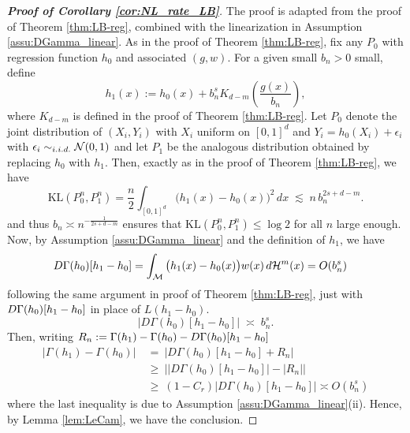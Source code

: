 \documentclass[12pt,american]{article}
\theoremstyle{definition}
\theoremstyle{plain}
\theoremstyle{definition}
\theoremstyle{plain}
\theoremstyle{plain}
\theoremstyle{plain}
\theoremstyle{plain}
\theoremstyle{plain}
\newcommand{\abs}[1]{\left| #1 \right|}
\begin{document}

\begin{proof}[\textbf{Proof of Corollary \ref{cor:NL_rate_LB}}]
The proof is adapted from the proof of Theorem \ref{thm:LB-reg}, combined with the linearization in Assumption \ref{assu:DGamma_linear}. As in the proof of Theorem \ref{thm:LB-reg}, fix any $P_0$ with regression function $h_0$ and associated $(g,w)$. For a given small $b_n>0$ small, define
\[
h_1(x) := h_0(x) + b_n^s K_{d-m}\!\left(\frac{g(x)}{b_n}\right),
\]
where $K_{d-m}$ is defined in the proof of Theorem \ref{thm:LB-reg}. Let $P_0$ denote the joint distribution of $(X_i,Y_i)$ with $X_i$ uniform on $[0,1]^d$ and
$Y_i = h_0(X_i)+\epsilon_i$ with $\epsilon_i\sim_{i.i.d.} \mathcal{N}(0,1)$ and let $P_1$ be the analogous distribution obtained by replacing $h_0$ with $h_1$. Then, exactly as in the proof of Theorem \ref{thm:LB-reg}, we have
\[
\mathrm{KL}(P_0^n,P_1^n)
= \frac{n}{2}\int_{[0,1]^d}\big(h_1(x)-h_0(x)\big)^2\,dx
\;\lesssim\; n\,b_n^{2s+d-m}.
\]
and thus $b_n \asymp n^{-\frac{1}{2s+d-m}}$ ensures that $\mathrm{KL}(P_0^n,P_1^n)\le\log 2$ for all $n$ large enough. Now, by Assumption \ref{assu:DGamma_linear} and the definition of $h_1$, we have
\begin{align*}
D\Gamma(h_0)[h_1-h_0]
&= \int_{\cM} \big(h_1(x)-h_0(x)\big)w(x)\,d\mathcal{H}^m(x) = O(b_n^s) %
\end{align*}
following the same argument in proof of Theorem \ref{thm:LB-reg}, just with $D\Gamma(h_0)[h_1-h_0]$ in place of $L(h_1-h_0)$.
\begin{equation}
\big|D\Gamma(h_0)[h_1-h_0]\big|
\;\asymp\; b_n^s.
\label{eq:linear-separation}
\end{equation}
Then, writing $R_n := \Gamma(h_1)-\Gamma(h_0)-D\Gamma(h_0)[h_1-h_0]$
\begin{align*}
\abs{\Gamma(h_1)-\Gamma(h_0)}
\ & =\  \abs{D\Gamma(h_0)[h_1-h_0] + R_n} \\
& \geq\  \abs{\abs{D\Gamma(h_0)[h_1-h_0]} - \abs{R_n}}\\
& \geq\  (1-C_r)\abs{D\Gamma(h_0)[h_1-h_0]} \asymp  O(b_n^s)
\end{align*}
where the last inequality is due to Assumption \ref{assu:DGamma_linear}(ii).
Hence, by Lemma \ref{lem:LeCam}, we have the conclusion.
\end{proof}
\end{document}
